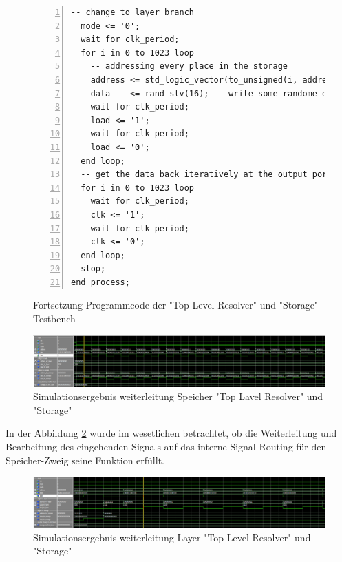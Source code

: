 \documentclass{article}
\numberwithin{equation}{section}
\begin{document}
\begin{figure}[htbp]
\begin{lstlisting}[style=VHDL,numbers=left,stepnumber=1,style=myCustomMatlabStyle,basicstyle=\footnotesize]
  -- change to layer branch
  mode <= '0';
  wait for clk_period;
  for i in 0 to 1023 loop
    -- addressing every place in the storage
    address <= std_logic_vector(to_unsigned(i, address'length));
    data    <= rand_slv(16); -- write some randome data in the storage
    wait for clk_period;
    load <= '1';
    wait for clk_period;
    load <= '0';
  end loop;
  -- get the data back iteratively at the output port
  for i in 0 to 1023 loop
    wait for clk_period;
    clk <= '1';
    wait for clk_period;
    clk <= '0';
  end loop;
  stop;
end process;
\end{lstlisting}
\caption{Fortsetzung Programmcode der "Top Level Resolver" und "Storage" Testbench} \label{code:tlr_storage_testbench2}
\end{figure}
\FloatBarrier
\begin{figure}[htb!]
    \begin{center}
      \includegraphics[width=15cm]{SimulationPictures/tlr_storage_store_sim.png}
    \end{center}
    \caption{Simulationsergebnis weiterleitung Speicher "Top Lavel Resolver" und "Storage"} \label{fig:tlr_storage_sim1}
  \end{figure}
\FloatBarrier
In der Abbildung \ref{fig:tlr_storage_sim1} wurde im wesetlichen betrachtet, ob die 
Weiterleitung und Bearbeitung des eingehenden Signals auf das interne Signal-Routing
für den Speicher-Zweig seine Funktion erfüllt.
\begin{figure}[htb!]
    \begin{center}
      \includegraphics[width=15cm]{SimulationPictures/tlr_storage_layer_sim.png}
    \end{center}
    \caption{Simulationsergebnis weiterleitung Layer "Top Level Resolver" und "Storage"} \label{fig:tlr_storage_sim2}
  \end{figure}
\end{document}
